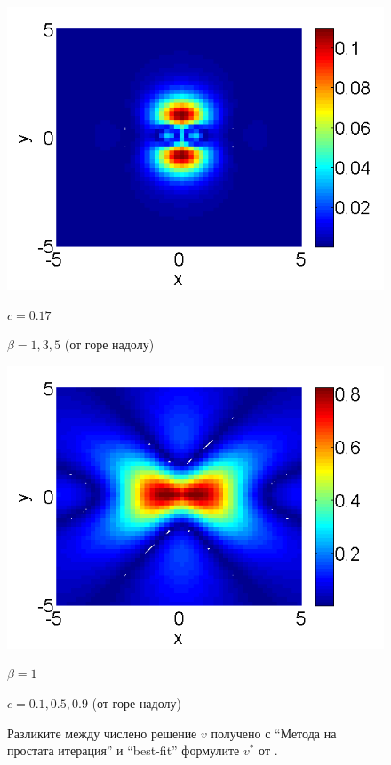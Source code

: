 \documentclass{article}
\begin{document}
\begin{figure}[htbp]
\begin{minipage}[b]{0.48\linewidth}
		 \includegraphics[width=\linewidth]{BestFitVsSimpleIter/ChristovIC_50_bt5_c017_h02_O(h^6).png}
		\centerline{$c=0.17$}
		\centerline{$\beta = 1,3,5$ (от горе надолу) }
	\end{minipage}
	\begin{minipage}[b]{0.48\linewidth}
		\raggedright
		 \includegraphics[width=\linewidth]{BestFitVsSimpleIter/ChristovIC_50_bt1_c090_h02_O(h^6).png}
		\centerline{$\beta = 1$}
		\centerline{$c = 0.1, 0.5, 0.9$ (от горе надолу)}
	\end{minipage}
	\caption{Разликите между числено решение $v$ получено с ``Метода на простата итерация'' и ``best-fit'' формулите $v^*$ от \cite{Ch2011}. }
	\label{fig:difference}
\end{figure}
\end{document}
